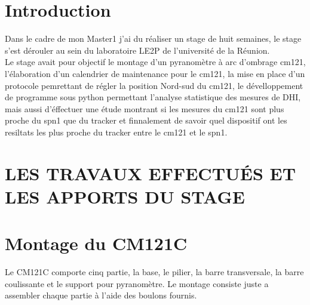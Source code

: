 \documentclass[12pt,a4paper]{article}
\begin{document}
\begin{flushleft}
\sf
\section*{Introduction}
%
\setcounter{page}{1}

Dans le cadre de mon Master1 j'ai du réaliser un stage de huit semaines, le stage s'est dérouler au sein du laboratoire LE2P de l'université de la Réunion.\\

Le stage avait pour objectif le montage d'un pyranomètre à arc d'ombrage cm121, l'élaboration d'un calendrier de maintenance pour le cm121, la mise en place d'un protocole pemrettant de régler la position Nord-sud du cm121, le dévelloppement de programme sous python permettant l'analyse statistique des mesures de DHI, mais aussi d'éffectuer une étude montrant si les mesures du cm121 sont plus proche du spn1 que du tracker et finnalement de savoir  quel dispositif ont les resiltats les plus proche du tracker entre le cm121 et le spn1.
 

\section{}
 
\section{LES TRAVAUX EFFECTUÉS ET LES APPORTS DU STAGE}



\section{Montage du CM121C}

Le CM121C comporte cinq partie, la base, le pilier, la barre transversale, la barre coulissante et le support pour pyranomètre. Le montage consiste juste a assembler chaque partie à l'aide des boulons fournis.


\end{flushleft}
\end{document}
